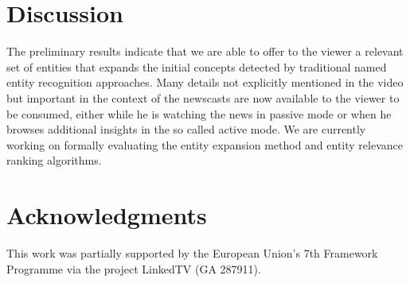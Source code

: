 \documentclass{llncs}
\begin{document}

\section{Discussion}
\label{sec:discussion}
The preliminary results indicate that we are able to offer to the viewer a relevant set of entities that expands the initial concepts detected by traditional named entity recognition approaches. Many details not explicitly mentioned in the video but important in the context of the newscasts are now available to the viewer to be consumed, either while he is watching the news in passive mode or when he browses additional insights in the so called active mode. We are currently working on formally evaluating the entity expansion method and entity relevance ranking algorithms.




\section*{Acknowledgments}
This work was partially supported by the European Union's 7th Framework Programme via the project LinkedTV (GA 287911).



\end{document}
